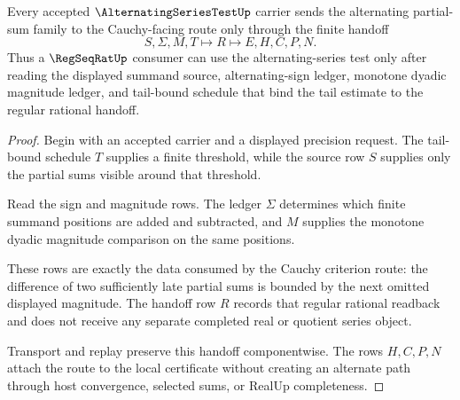\begin{theorem}
\label{thm:alternating-series-test-cauchy-handoff}
Every accepted $\AlternatingSeriesTestUp$ carrier sends the alternating partial-sum family to the Cauchy-facing route only through the finite handoff
$$
S,\Sigma,M,T \longmapsto R \longmapsto E,H,C,P,N.
$$
Thus a $\RegSeqRatUp$ consumer can use the alternating-series test only after reading the displayed summand source, alternating-sign ledger, monotone dyadic magnitude ledger, and tail-bound schedule that bind the tail estimate to the regular rational handoff.
\end{theorem}
\begin{proof}
Begin with an accepted carrier and a displayed precision request. The tail-bound schedule $T$ supplies a finite threshold, while the source row $S$ supplies only the partial sums visible around that threshold.

Read the sign and magnitude rows. The ledger $\Sigma$ determines which finite summand positions are added and subtracted, and $M$ supplies the monotone dyadic magnitude comparison on the same positions.

These rows are exactly the data consumed by the Cauchy criterion route: the difference of two sufficiently late partial sums is bounded by the next omitted displayed magnitude. The handoff row $R$ records that regular rational readback and does not receive any separate completed real or quotient series object.

Transport and replay preserve this handoff componentwise. The rows $H,C,P,N$ attach the route to the local certificate without creating an alternate path through host convergence, selected sums, or RealUp completeness.
\end{proof}

